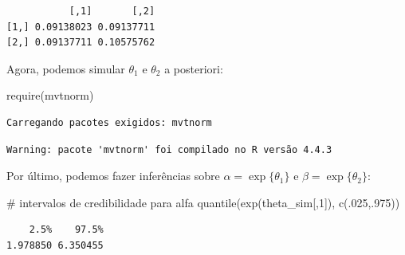 \documentclass[
  letterpaper,
  DIV=11,
  numbers=noendperiod]{scrreprt}
\newenvironment{Shaded}{\begin{snugshade}}{\end{snugshade}}
\newcommand{\CommentTok}[1]{\textcolor[rgb]{0.37,0.37,0.37}{#1}}
\newcommand{\DecValTok}[1]{\textcolor[rgb]{0.68,0.00,0.00}{#1}}
\newcommand{\FunctionTok}[1]{\textcolor[rgb]{0.28,0.35,0.67}{#1}}
\newcommand{\NormalTok}[1]{\textcolor[rgb]{0.00,0.23,0.31}{#1}}
\newcommand{\OtherTok}[1]{\textcolor[rgb]{0.00,0.23,0.31}{#1}}
\newcommand{\SpecialCharTok}[1]{\textcolor[rgb]{0.37,0.37,0.37}{#1}}
\theoremstyle{definition}
\theoremstyle{plain}
\theoremstyle{definition}
\theoremstyle{remark}
\begin{document}
\begin{Shaded}
\end{Shaded}

\begin{verbatim}
           [,1]       [,2]
[1,] 0.09138023 0.09137711
[2,] 0.09137711 0.10575762
\end{verbatim}

Agora, podemos simular \(\theta_1\) e \(\theta_2\) a posteriori:

\begin{Shaded}
\begin{Highlighting}[]
\FunctionTok{require}\NormalTok{(mvtnorm)}
\end{Highlighting}
\end{Shaded}

\begin{verbatim}
Carregando pacotes exigidos: mvtnorm
\end{verbatim}

\begin{verbatim}
Warning: pacote 'mvtnorm' foi compilado no R versão 4.4.3
\end{verbatim}

\begin{Shaded}
\end{Shaded}

Por último, podemos fazer inferências sobre \(\alpha=\exp\{\theta_1\}\)
e \(\beta=\exp\{\theta_2\}\):

\begin{Shaded}
\begin{Highlighting}[]
\CommentTok{\# intervalos de credibilidade para alfa}
\FunctionTok{quantile}\NormalTok{(}\FunctionTok{exp}\NormalTok{(theta\_sim[,}\DecValTok{1}\NormalTok{]), }\FunctionTok{c}\NormalTok{(.}\DecValTok{025}\NormalTok{,.}\DecValTok{975}\NormalTok{))}
\end{Highlighting}
\end{Shaded}

\begin{verbatim}
    2.5%    97.5% 
1.978850 6.350455 
\end{verbatim}
\end{document}
